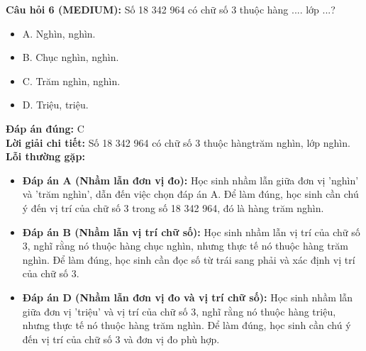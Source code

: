 \documentclass{article}
\begin{document}
\begin{minipage}{\textwidth}
\noindent\textbf{Câu hỏi 6 (MEDIUM):} Số 18 342 964 có chữ số 3 thuộc hàng .... lớp ...? 
\begin{itemize}[label={}]
    \item A. Nghìn, nghìn.
    \item B. Chục nghìn, nghìn.
    \item C. Trăm nghìn, nghìn.
    \item D. Triệu, triệu.
\end{itemize}
\textbf{Đáp án đúng:} C \\
\textbf{Lời giải chi tiết:} Số 18 342 964 có chữ số 3 thuộc hàngtrăm nghìn, lớp nghìn. \\
\textbf{Lỗi thường gặp:}
\begin{itemize}
  \item \textbf{Đáp án A (Nhầm lẫn đơn vị đo):} Học sinh nhầm lẫn giữa đơn vị 'nghìn' và 'trăm nghìn', dẫn đến việc chọn đáp án A. Để làm đúng, học sinh cần chú ý đến vị trí của chữ số 3 trong số 18 342 964, đó là hàng trăm nghìn.
  \item \textbf{Đáp án B (Nhầm lẫn vị trí chữ số):} Học sinh nhầm lẫn vị trí của chữ số 3, nghĩ rằng nó thuộc hàng chục nghìn, nhưng thực tế nó thuộc hàng trăm nghìn. Để làm đúng, học sinh cần đọc số từ trái sang phải và xác định vị trí của chữ số 3.
  \item \textbf{Đáp án D (Nhầm lẫn đơn vị đo và vị trí chữ số):} Học sinh nhầm lẫn giữa đơn vị 'triệu' và vị trí của chữ số 3, nghĩ rằng nó thuộc hàng triệu, nhưng thực tế nó thuộc hàng trăm nghìn. Để làm đúng, học sinh cần chú ý đến vị trí của chữ số 3 và đơn vị đo phù hợp.
\end{itemize}
\end{minipage}
\vspace{1em}
\end{document}
